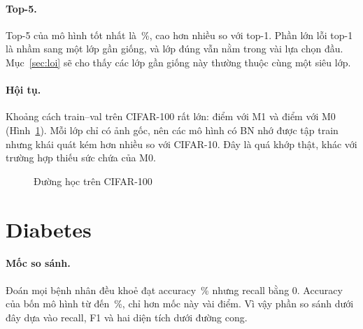 \paragraph{Top-5.} Top-5 của mô hình tốt nhất là \,\%, cao hơn nhiều so với top-1.
Phần lớn lỗi top-1 là nhầm sang một lớp gần giống, và lớp đúng vẫn nằm trong vài lựa chọn đầu. Mục~\ref{sec:loi} sẽ cho thấy
các lớp gần giống này thường thuộc cùng một siêu lớp.

\paragraph{Hội tụ.} Khoảng cách train--val trên CIFAR-100 rất lớn:  điểm với M1 và
 điểm với M0 (Hình~\ref{fig:hoccifar100}). Mỗi lớp chỉ có  ảnh gốc, nên các
mô hình có BN nhớ được tập train nhưng khái quát kém hơn nhiều so với CIFAR-10. Đây là quá khớp thật, khác với trường hợp
thiếu sức chứa của M0.

\begin{figure}[H]
  \centering
  \caption{Đường học trên CIFAR-100}
  \label{fig:hoccifar100}
\end{figure}

\section{Diabetes}

\begin{table}[H]
  \centering
  \caption{Kết quả trên tập test Diabetes ( bệnh nhân). In đậm: giá trị cao nhất mỗi cột}
  \label{tab:kqdiabetes}
  \scriptsize
\end{table}

\paragraph{Mốc so sánh.} Đoán mọi bệnh nhân đều khoẻ đạt accuracy \,\% nhưng recall bằng 0. Accuracy của bốn
mô hình từ  đến \,\%, chỉ hơn mốc này vài điểm. Vì vậy phần so sánh dưới đây dựa vào recall, F1 và
hai diện tích dưới đường cong.

